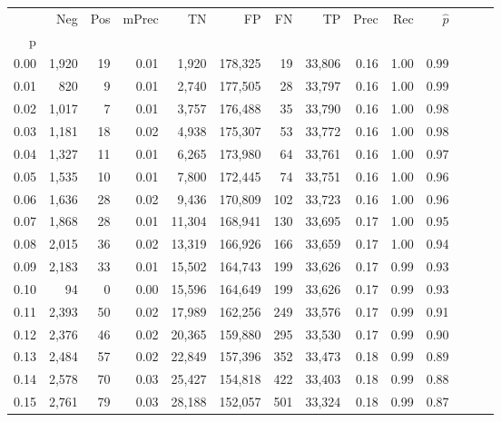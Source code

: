 \begin{tabular}{rrrrrrrrrrrrrr}
\toprule
{} &    Neg &  Pos & mPrec &       TN &       FP &      FN &      TP &  Prec &   Rec & $\hat{p}$ \\
p    &        &      &       &          &          &         &         &       &       &           \\
\midrule
0.00 &  1,920 &   19 &  0.01 &    1,920 &  178,325 &      19 &  33,806 &  0.16 &  1.00 &      0.99 \\
0.01 &    820 &    9 &  0.01 &    2,740 &  177,505 &      28 &  33,797 &  0.16 &  1.00 &      0.99 \\
0.02 &  1,017 &    7 &  0.01 &    3,757 &  176,488 &      35 &  33,790 &  0.16 &  1.00 &      0.98 \\
0.03 &  1,181 &   18 &  0.02 &    4,938 &  175,307 &      53 &  33,772 &  0.16 &  1.00 &      0.98 \\
0.04 &  1,327 &   11 &  0.01 &    6,265 &  173,980 &      64 &  33,761 &  0.16 &  1.00 &      0.97 \\
0.05 &  1,535 &   10 &  0.01 &    7,800 &  172,445 &      74 &  33,751 &  0.16 &  1.00 &      0.96 \\
0.06 &  1,636 &   28 &  0.02 &    9,436 &  170,809 &     102 &  33,723 &  0.16 &  1.00 &      0.96 \\
0.07 &  1,868 &   28 &  0.01 &   11,304 &  168,941 &     130 &  33,695 &  0.17 &  1.00 &      0.95 \\
0.08 &  2,015 &   36 &  0.02 &   13,319 &  166,926 &     166 &  33,659 &  0.17 &  1.00 &      0.94 \\
0.09 &  2,183 &   33 &  0.01 &   15,502 &  164,743 &     199 &  33,626 &  0.17 &  0.99 &      0.93 \\
0.10 &     94 &    0 &  0.00 &   15,596 &  164,649 &     199 &  33,626 &  0.17 &  0.99 &      0.93 \\
0.11 &  2,393 &   50 &  0.02 &   17,989 &  162,256 &     249 &  33,576 &  0.17 &  0.99 &      0.91 \\
0.12 &  2,376 &   46 &  0.02 &   20,365 &  159,880 &     295 &  33,530 &  0.17 &  0.99 &      0.90 \\
0.13 &  2,484 &   57 &  0.02 &   22,849 &  157,396 &     352 &  33,473 &  0.18 &  0.99 &      0.89 \\
0.14 &  2,578 &   70 &  0.03 &   25,427 &  154,818 &     422 &  33,403 &  0.18 &  0.99 &      0.88 \\
0.15 &  2,761 &   79 &  0.03 &   28,188 &  152,057 &     501 &  33,324 &  0.18 &  0.99 &      0.87 \\

\end{tabular}
